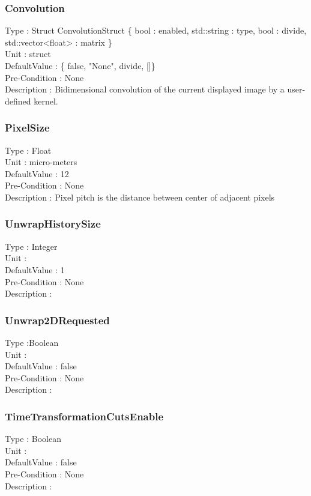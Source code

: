 \subsubsection{Convolution}
\noindent
Type : Struct ConvolutionStruct \{ bool : enabled, std::string : type, bool : divide, std::vector<float> : matrix \}\\
Unit : struct\\
DefaultValue : \{ false, "None", divide, []\}\\
Pre-Condition : None\\
Description : Bidimensional convolution of the current displayed image by a user-defined kernel.\\

\subsubsection{PixelSize}
\noindent
Type : Float\\
Unit : micro-meters\\
DefaultValue : 12\\
Pre-Condition : None\\
Description : Pixel pitch is the distance between center of adjacent pixels\\

\subsubsection{UnwrapHistorySize}
\noindent
Type : Integer\\
Unit : \\
DefaultValue : 1\\
Pre-Condition : None\\
Description : \\

\subsubsection{Unwrap2DRequested}
\noindent
Type :Boolean \\
Unit : \\
DefaultValue : false\\
Pre-Condition : None\\
Description : \\

\subsubsection{TimeTransformationCutsEnable}
\noindent
Type : Boolean\\
Unit : \\
DefaultValue : false\\
Pre-Condition : None\\
Description : \\

